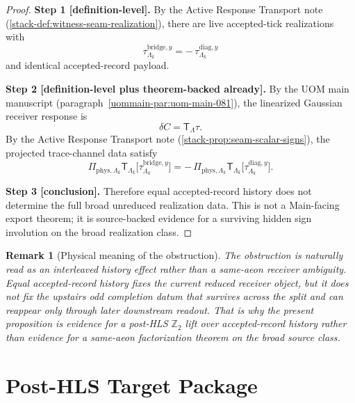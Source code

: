 \documentclass[11pt]{article}
\newtheorem{remark}[theorem]{Remark}
\theoremstyle{definition}
\begin{document}
\begin{proof}
\noindent\textbf{Step 1 [definition-level].}
By the Active Response Transport note \textup{(\cref{stack-def:witness-seam-realization})}, there
are live accepted-tick realizations with
\[
\tau^{\mathrm{bridge},y}_{\Lambda_k}
=
-\,\tau^{\mathrm{diag},y}_{\Lambda_k}
\]
and identical accepted-record payload.

\noindent\textbf{Step 2 [definition-level plus theorem-backed already].}
By the UOM main manuscript \textup{(paragraph~\ref{uommain-par:uom-main-081})}, the linearized Gaussian
receiver response is
\[
\delta C=\mathsf T_\Lambda \tau.
\]
By the Active Response Transport note \textup{(\cref{stack-prop:seam-scalar-signs})}, the projected
trace-channel data satisfy
\[
\Pi_{\mathrm{phys},\Lambda_k}\mathsf T_{\Lambda_k}\!\big[\tau^{\mathrm{bridge},y}_{\Lambda_k}\big]
=
-\,\Pi_{\mathrm{phys},\Lambda_k}\mathsf T_{\Lambda_k}\!\big[\tau^{\mathrm{diag},y}_{\Lambda_k}\big].
\]

\noindent\textbf{Step 3 [conclusion].}
Therefore equal accepted-record history does not determine the full broad unreduced realization
data. This is not a Main-facing export theorem; it is source-backed evidence for a surviving hidden
sign involution on the broad realization class.
\end{proof}

\begin{remark}[Physical meaning of the obstruction]
\label{rem:broad-tau-obstruction-physical}
The obstruction is naturally read as an interleaved history effect rather than a same-aeon receiver
ambiguity.
Equal accepted-record history fixes the current reduced receiver object, but it does not fix the
upstairs odd completion datum that survives across the split and can reappear only through later
downstream readout.
That is why the present proposition is evidence for a post-HLS \(\mathbb Z_2\) lift over
accepted-record history rather than evidence for a same-aeon factorization theorem on the broad
source class.
\end{remark}

\section{Post-HLS Target Package}
\end{document}
